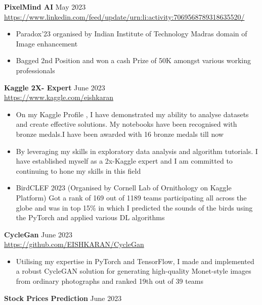 \documentclass[a4paper]{article}
\begin{document}
{\textbf{PixelMind AI}} \hfill May 2023 \\
\vspace{-1mm}
\url{https://www.linkedin.com/feed/update/urn:li:activity:7069568789318635520/} \\
\vspace{-1.5mm}
\begin{itemize} 
	\item Paradox’23 organised by Indian Institute of Technology Madras domain of Image enhancement
    \item Bagged 2nd Position and won a cash Prize of 50K amongst various working professionals 
\end{itemize}
{\textbf{Kaggle 2X- Expert}} \hfill June 2023 \\
\vspace{-1mm}
\url{https://www.kaggle.com/eishkaran} \\
\vspace{-2mm}
\begin{itemize} 
	\item On my Kaggle Profile , I have demonstrated my ability to analyse datasets and create effective solutions. My notebooks have been recognised with bronze medals.I have been awarded with 16 bronze medals till now
    \item By leveraging my skills in exploratory data analysis and algorithm tutorials. I have established myself as a 2x-Kaggle expert and I am committed to continuing to hone my skills in this field 
    \item BirdCLEF 2023 (Organised by Cornell Lab of Ornithology on Kaggle Platform) Got a rank of 169 out of 1189 teams participating all across the globe and was in top 15\%  in which I predicted the sounds of the birds using the PyTorch and applied various DL algorithms 

    
\end{itemize}
{\textbf{CycleGan }} \hfill June 2023\\
\vspace{-1mm}
\url{https://github.com/EISHKARAN/CycleGan} \\
\vspace{-2mm}
\begin{itemize} 
    \item Utilising my expertise in PyTorch and TensorFlow, I made and implemented a robust CycleGAN solution for generating high-quality Monet-style images from ordinary photographs and ranked 19th out of 39 teams
\end{itemize}
{\textbf{Stock Prices Prediction}} \hfill June 2023 \\
\end{document}
